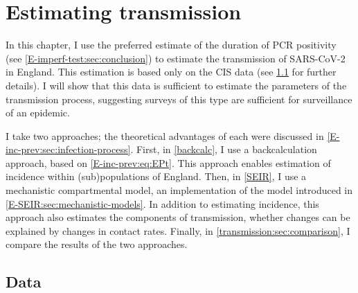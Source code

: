 \documentclass[thesis.tex]{subfiles}
\begin{document}
\ifSubfilesClassLoaded{
    \setcounter{chapter}{6}
}

\chapter{Estimating transmission} \label{transmission}


In this chapter, I use the preferred estimate of the duration of PCR positivity (see \cref{E-imperf-test:sec:conclusion}) to estimate the transmission of SARS-CoV-2 in England.
This estimation is based only on the CIS data (see \cref{transmission:sec:data} for further details).
I will show that this data is sufficient to estimate the parameters of the transmission process, suggesting surveys of this type are sufficient for surveillance of an epidemic.

I take two approaches; the theoretical advantages of each were discussed in \cref{E-inc-prev:sec:infection-process}.
First, in \cref{backcalc}, I use a backcalculation approach, based on \cref{E-inc-prev:eq:EPt}.
This approach enables estimation of incidence within (sub)populations of England.
Then, in \cref{SEIR}, I use a mechanistic compartmental model, an implementation of the model introduced in \cref{E-SEIR:sec:mechanistic-models}.
In addition to estimating incidence, this approach also estimates the components of transmission, \eg whether changes can be explained by changes in contact rates.
Finally, in \cref{transmission:sec:comparison}, I compare the results of the two approaches.

\section{Data} \label{transmission:sec:data}

\end{document}
